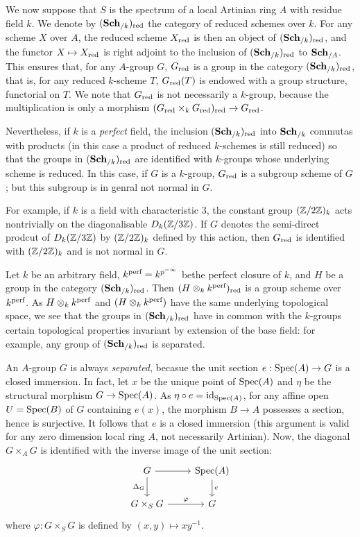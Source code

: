 We now suppose that $S$ is the spectrum of a local Artinian ring $A$ with residue field $k$. We denote by $(\mathbf{Sch}_{/k})_{\mathrm{red}}$ the category of reduced schemes over $k$. For any scheme $X$ over $A$, the reduced scheme $X_{\mathrm{red}}$ is then an object of $(\mathbf{Sch}_{/k})_{\mathrm{red}}$, and the functor $X\mapsto X_{\mathrm{red}}$ is right adjoint to the inclusion of $(\mathbf{Sch}_{/k})_{\mathrm{red}}$ to $\mathbf{Sch}_{/A}$. This ensures that, for any $A$-group $G$, $G_{\mathrm{red}}$ is a group in the category $(\mathbf{Sch}_{/k})_{\mathrm{red}}$, that is, for any reduced $k$-scheme $T$, $G_{\mathrm{red}}(T)$ is endowed with a group structure, functorial on $T$. We note that $G_{\mathrm{red}}$ is not necessarily a $k$-group, because the multiplication is only a morphism $(G_{\mathrm{red}}\times_k G_{\mathrm{red}})_{\mathrm{red}}\to G_{\mathrm{red}}$.\par 
Nevertheless, if $k$ is a \textit{perfect} field, the inclusion $(\mathbf{Sch}_{/k})_{\mathrm{red}}$ into $\mathbf{Sch}_{/k}$ commutas with products (in this case a product of reduced $k$-schemes is still reduced) so that the groups in $(\mathbf{Sch}_{/k})_{\mathrm{red}}$ are identified with $k$-groups whose underlying scheme is reduced. In this case, if $G$ is a $k$-group, $G_{\mathrm{red}}$ is a subgroup scheme of $G$; but this subgroup is in genral not normal in $G$.\par
For example, if $k$ is a field with characteristic $3$, the constant group $(\mathbb{Z}/2\mathbb{Z})_k$ acts nontrivially on the diagonalisable $D_k(\mathbb{Z}/3\mathbb{Z})$. If $G$ denotes the semi-direct prodcut of $D_k(\mathbb{Z}/3\mathbb{Z})$ by $(\mathbb{Z}/2\mathbb{Z})_k$ defined by this action, then $G_{\mathrm{red}}$ is identified with $(\mathbb{Z}/2\mathbb{Z})_k$ and is not normal in $G$.\par
Let $k$ be an arbitrary field, $k^{\textup{perf}}=k^{p^{-\infty}}$ bethe perfect closure of $k$, and $H$ be a group in the category $(\mathbf{Sch}_{/k})_{\mathrm{red}}$. Then $(H\otimes_kk^{\textup{perf}})_{\mathrm{red}}$ is a group scheme over $k^{\textup{perf}}$. As $H\otimes_kk^{\textup{perf}}$ and $(H\otimes_kk^{\textup{perf}})$ have the same underlying topological space, we see that the groups in $(\mathbf{Sch}_{/k})_{\mathrm{red}}$ have in common with the $k$-groups certain topological properties invariant by extension of the base field: for example, any group of $(\mathbf{Sch}_{/k})_{\mathrm{red}}$ is separated.\par

An $A$-group $G$ is always \textit{separated}, becasue the unit section $e:\mathrm{Spec}(A)\to G$ is a closed immersion. In fact, let $x$ be the unique point of $\mathrm{Spec}(A)$ and $\eta$ be the structural morphism $G\to\mathrm{Spec}(A)$. As $\eta\circ e=\operatorname{id}_{\mathrm{Spec}(A)}$, for any affine open $U=\mathrm{Spec}(B)$ of $G$ containing $e(x)$, the morphism $B\to A$ possesses a section, hence is surjective. It follows that $e$ is a closed immersion (this argument is valid for any zero dimension local ring $A$, not necessarily Artinian). Now, the diagonal $G\times_AG$ is identified with the inverse image of the unit section:
\[\begin{tikzcd}
G\ar[r]\ar[d,swap,"\Delta_G"]&\Spec(A)\ar[d,"e"]\\
G\times_SG\ar[r,"\varphi"]&G
\end{tikzcd}\]
where $\varphi:G\times_SG$ is defined by $(x,y)\mapsto xy^{-1}$.\par


